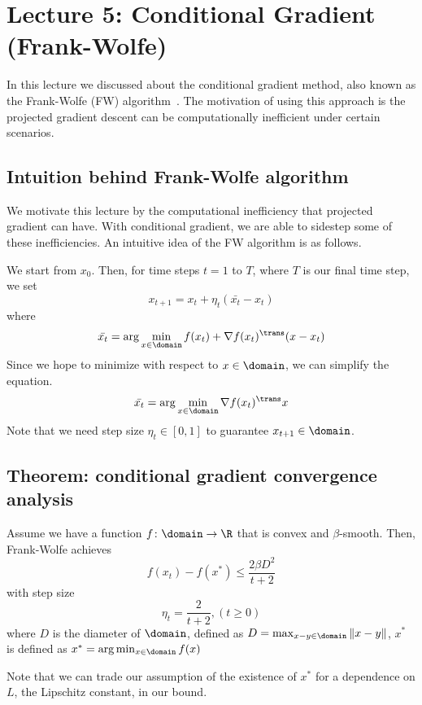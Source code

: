 \section{Lecture 5: Conditional Gradient (Frank-Wolfe)}
In this lecture we discussed about the conditional gradient method, also known as the Frank-Wolfe (FW) algorithm~\cite{Frank1956}. The motivation of using this approach is the projected gradient descent can be computationally inefficient under certain scenarios.

\subsection{Intuition behind Frank-Wolfe algorithm}
We motivate this lecture by the computational inefficiency that projected gradient can have. With conditional gradient, we are able to sidestep some of these inefficiencies. An intuitive idea of the FW algorithm is as follows.

We start from $x_0$. Then, for time steps $t = 1$ to $T$, where $T$ is our final time step, we set
$$ x_{t+1} = x_t + \eta_t(\bar{x_t}-x_t) $$
where
$$ \bar{x_t} = \arg\min_{x\in \domain} f(x_t) + \nabla f(x_t) ^\trans (x-x_t)$$
Since we hope to minimize with respect to $x \in \domain$, we can simplify the equation.
$$ \bar{x_t} = \arg\min_{x\in \domain} \nabla f(x_t) ^\trans x $$
Note that we need step size $\eta_t \in [0,1]$ to guarantee $x_{t+1} \in \domain$.

\subsection{Theorem: conditional gradient convergence analysis}
\begin{theorem}
Assume we have a function $f\colon\domain\to\R$ that is convex and $\beta$-smooth.
Then, Frank-Wolfe achieves
$$ f(x_t) - f(x^*) \leq \frac{2\beta D^2}{t+2}$$
with step size 
$$\eta_t = \frac{2}{t+2}, (t\geq 0)$$
where $D$ is the diameter of $\domain$, defined as
$ D = \max_{x-y \in \domain} \| x-y \|$, $x^*$ is defined as $x^* = \arg\min_{x\in\domain}f(x)$
\end{theorem}
Note that we can trade our assumption of the existence of $x^*$ for a dependence on $L$, the Lipschitz constant, in our bound.

